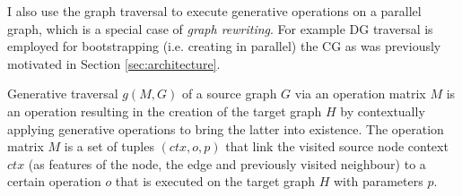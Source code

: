     I also use the graph traversal to execute generative operations on a parallel graph, which is a special case of \textit{graph rewriting}. For example DG traversal is employed for bootstrapping (i.e. creating in parallel) the CG as was previously motivated in Section \ref{sec:architecture}.

    \begin{definition}\label{def:generative-traversal}
        Generative traversal $g(M,G)$ of a source graph $G$ via an operation matrix $M$ is an operation resulting in the creation of the target graph $H$ by contextually applying generative operations to bring the latter into existence. The operation matrix $M$ is a set of tuples $(ctx,o,p)$ that link the visited source node context $ctx$ (as features of the node, the edge and previously visited neighbour) to a certain operation $o$ that is executed on the target graph $H$ with parameters $p$.
    \end{definition}

    
